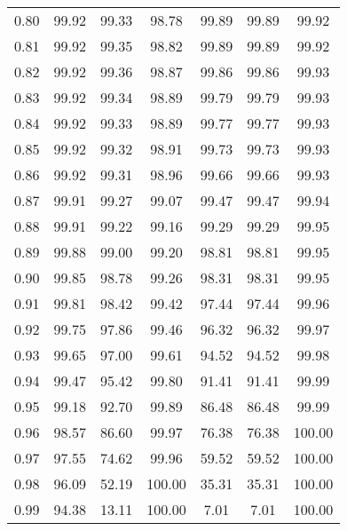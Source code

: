 \begin{tabular}{|c|c|c|c|c|c|c|}
      0.80 &     99.92 &     99.33 &      98.78 &   99.89 &      99.89 &         99.92 \\
      0.81 &     99.92 &     99.35 &      98.82 &   99.89 &      99.89 &         99.92 \\
      0.82 &     99.92 &     99.36 &      98.87 &   99.86 &      99.86 &         99.93 \\
      0.83 &     99.92 &     99.34 &      98.89 &   99.79 &      99.79 &         99.93 \\
      0.84 &     99.92 &     99.33 &      98.89 &   99.77 &      99.77 &         99.93 \\
      0.85 &     99.92 &     99.32 &      98.91 &   99.73 &      99.73 &         99.93 \\
      0.86 &     99.92 &     99.31 &      98.96 &   99.66 &      99.66 &         99.93 \\
      0.87 &     99.91 &     99.27 &      99.07 &   99.47 &      99.47 &         99.94 \\
      0.88 &     99.91 &     99.22 &      99.16 &   99.29 &      99.29 &         99.95 \\
      0.89 &     99.88 &     99.00 &      99.20 &   98.81 &      98.81 &         99.95 \\
      0.90 &     99.85 &     98.78 &      99.26 &   98.31 &      98.31 &         99.95 \\
      0.91 &     99.81 &     98.42 &      99.42 &   97.44 &      97.44 &         99.96 \\
      0.92 &     99.75 &     97.86 &      99.46 &   96.32 &      96.32 &         99.97 \\
      0.93 &     99.65 &     97.00 &      99.61 &   94.52 &      94.52 &         99.98 \\
      0.94 &     99.47 &     95.42 &      99.80 &   91.41 &      91.41 &         99.99 \\
      0.95 &     99.18 &     92.70 &      99.89 &   86.48 &      86.48 &         99.99 \\
      0.96 &     98.57 &     86.60 &      99.97 &   76.38 &      76.38 &        100.00 \\
      0.97 &     97.55 &     74.62 &      99.96 &   59.52 &      59.52 &        100.00 \\
      0.98 &     96.09 &     52.19 &     100.00 &   35.31 &      35.31 &        100.00 \\
      0.99 &     94.38 &     13.11 &     100.00 &    7.01 &       7.01 &        100.00 \\
\bottomrule
\end{tabular}
